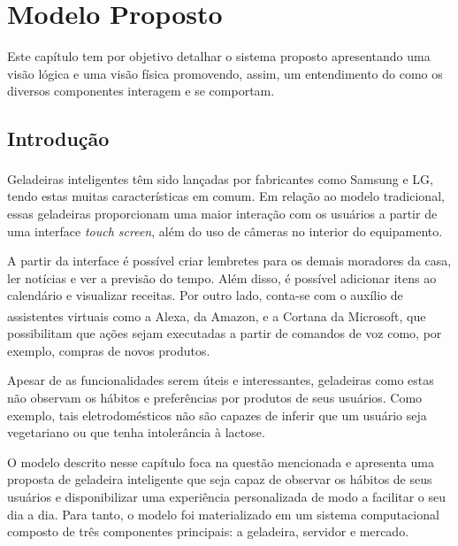 \chapter{Modelo Proposto}
\label{cap:sistema_proposto}


Este capítulo tem por objetivo detalhar o sistema proposto apresentando uma visão lógica e uma visão física promovendo, assim, um entendimento do como os diversos componentes interagem e se comportam.

\section{Introdução}

Geladeiras inteligentes têm sido lançadas por fabricantes como Samsung\textsuperscript{\textregistered} e LG\textsuperscript{\textregistered}, tendo estas muitas características em comum. Em relação ao modelo tradicional, essas geladeiras proporcionam uma maior interação com os usuários a partir de uma interface \textit{touch screen}, além do uso de câmeras no interior do equipamento.

A partir da interface é possível criar lembretes para os demais moradores da casa, ler notícias e ver a previsão do tempo. Além disso, é possível adicionar itens ao calendário e visualizar receitas. Por outro lado, conta-se com o auxílio de assistentes virtuais como a Alexa\textsuperscript{\textregistered}, da Amazon\textsuperscript{\textregistered}, e a Cortana\textsuperscript{\textregistered} da Microsoft\textsuperscript{\textregistered}, que possibilitam que ações sejam executadas a partir de comandos de voz como, por exemplo, compras de novos produtos. 

Apesar de as funcionalidades serem úteis e interessantes, geladeiras como estas não observam os hábitos e preferências por produtos de seus usuários. Como exemplo, tais eletrodomésticos não são capazes de inferir que um usuário seja vegetariano ou que tenha intolerância à lactose.

    


O modelo descrito nesse capítulo foca na questão mencionada e apresenta uma proposta de geladeira inteligente que seja capaz de observar os hábitos de seus usuários e disponibilizar uma experiência personalizada de modo a facilitar o seu dia a dia. Para tanto, o modelo foi materializado em um sistema computacional composto de três componentes principais: a geladeira, servidor e mercado.

